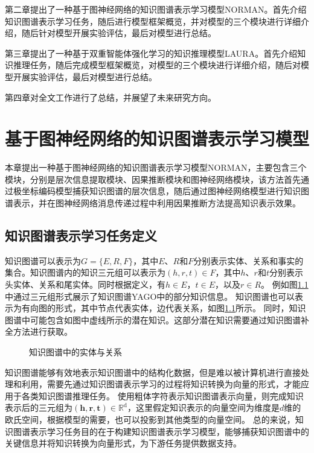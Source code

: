 \documentclass[algorithmlist, AutoFakeBold, AutoFakeSlant, figurelist, tablelist, nomlist, engineering]{seuthesix}
\begin{document}
第二章提出了一种基于图神经网络的知识图谱表示学习模型NORMAN。首先介绍知识图谱表示学习任务，随后进行模型框架概览，并对模型的三个模块进行详细介绍，随后针对模型开展实验评估，最后对模型进行总结。

第三章提出了一种基于双重智能体强化学习的知识推理模型LAURA。首先介绍知识推理任务，随后完成模型框架概览，对模型的三个模块进行详细介绍，随后对模型开展实验评估，最后对模型进行总结。

第四章对全文工作进行了总结，并展望了未来研究方向。


\chapter{基于图神经网络的知识图谱表示学习模型}
本章提出一种基于图神经网络的知识图谱表示学习模型NORMAN，主要包含三个模块，分别是层次信息提取模块、因果推断模块和图神经网络模块，该方法首先通过极坐标编码模型捕获知识图谱的层次信息，随后通过图神经网络模型进行知识图谱表示，并在图神经网络消息传递过程中利用因果推断方法提高知识表示效果。

\section{知识图谱表示学习任务定义}
知识图谱可以表示为$G=\{E, R, F\}$，其中$E$、$R$和$F$分别表示实体、关系和事实的集合。知识图谱内的知识三元组可以表示为$(h, r, t) \in F$，其中$h$、$r$和$t$分别表示头实体、关系和尾实体。同时根据定义，有$h \in E$，$t \in E$，以及$r \in R$。
例如图\ref{2_KG}中通过三元组形式展示了知识图谱YAGO中的部分知识信息。
知识图谱也可以表示为有向图的形式，其中节点代表实体，边代表关系，如图\ref{2_KG}所示。
同时，知识图谱中可能包含如图中虚线所示的潜在知识。这部分潜在知识需要通过知识图谱补全方法进行获取。
\begin{figure}[H]
  \centering
  \caption{知识图谱中的实体与关系}
  \label{2_KG}
\end{figure}

知识图谱能够有效地表示知识图谱中的结构化数据，但是难以被计算机进行直接处理和利用，需要先通过知识图谱表示学习的过程将知识转换为向量的形式，才能应用于各类知识图谱推理任务。
使用粗体字符表示知识图谱表示向量，则完成知识表示后的三元组为$\left(\bm{h}, \bm{r}, \bm{t}\right) \in \mathbb{R}^{\mathrm{d}}$，这里假定知识表示的向量空间为维度是$d$维的欧氏空间，根据模型的需要，也可以投影到其他类型的向量空间。
总的来说，知识图谱表示学习任务目的在于构建知识图谱表示学习模型，能够捕获知识图谱中的关键信息并将知识转换为向量形式，为下游任务提供数据支持。
\end{document}
